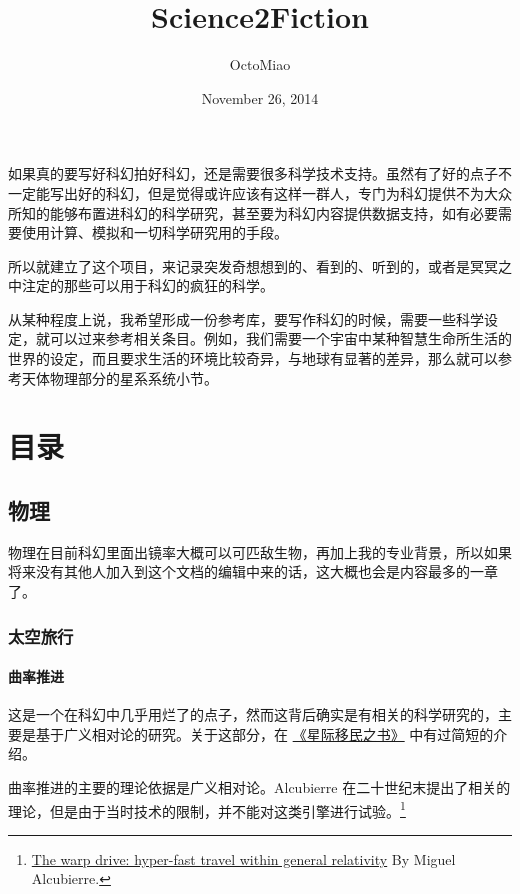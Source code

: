 \documentclass[letterpaper,10pt,english]{sphinxmanual}
\title{Science2Fiction}
\date{November 26, 2014}
\author{OctoMiao}
\begin{document}
\maketitle
\tableofcontents
{}\label{index::doc}


如果真的要写好科幻拍好科幻，还是需要很多科学技术支持。虽然有了好的点子不一定能写出好的科幻，但是觉得或许应该有这样一群人，专门为科幻提供不为大众所知的能够布置进科幻的科学研究，甚至要为科幻内容提供数据支持，如有必要需要使用计算、模拟和一切科学研究用的手段。

所以就建立了这个项目，来记录突发奇想想到的、看到的、听到的，或者是冥冥之中注定的那些可以用于科幻的疯狂的科学。

从某种程度上说，我希望形成一份参考库，要写作科幻的时候，需要一些科学设定，就可以过来参考相关条目。例如，我们需要一个宇宙中某种智慧生命所生活的世界的设定，而且要求生活的环境比较奇异，与地球有显著的差异，那么就可以参考天体物理部分的星系系统小节。


\chapter{目录}
\label{index:id2}\label{index:id1}

\section{物理}
\label{physics::doc}\label{physics:id1}
物理在目前科幻里面出镜率大概可以可匹敌生物，再加上我的专业背景，所以如果将来没有其他人加入到这个文档的编辑中来的话，这大概也会是内容最多的一章了。


\subsection{太空旅行}
\label{physics:id2}

\subsubsection{曲率推进}
\label{physics:id3}
这是一个在科幻中几乎用烂了的点子，然而这背后确实是有相关的科学研究的，主要是基于广义相对论的研究。关于这部分，在 \href{http://interimm.org/InterImmBook/tech/propulsion.html}{《星际移民之书》} 中有过简短的介绍。

曲率推进的主要的理论依据是广义相对论。Alcubierre 在二十世纪末提出了相关的理论，但是由于当时技术的限制，并不能对这类引擎进行试验。\footnote{
\href{http://arxiv.org/abs/gr-qc/0009013}{The warp drive: hyper-fast travel within general relativity} By Miguel Alcubierre.
}
\end{document}
